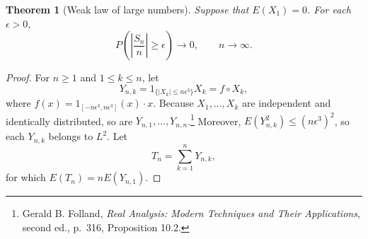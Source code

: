 \documentclass{article}
\newtheorem{theorem}{Theorem}
\theoremstyle{definition}
\begin{document}
\begin{theorem}[Weak law of large numbers]
Suppose that $E(X_1)=0$.
For each $\epsilon>0$,
\[
P\left( \left| \frac{S_n}{n} \right| \geq \epsilon \right) \to 0, \qquad n \to \infty.
\]
\label{weaklaw}
\end{theorem}
\begin{proof}
For $n \geq 1$ and $1 \leq k \leq n$, let
\[
Y_{n,k} = 1_{\{|X_k| \leq n \epsilon^3\}} X_k = f \circ X_k,
\]
where $f(x)=1_{[-n\epsilon^3,n\epsilon^3]}(x) \cdot x$. 
Because $X_1,\ldots,X_k$ are independent and identically distributed, so are 
$Y_{n,1},\ldots,Y_{n,n}$.\footnote{Gerald B. Folland, {\em Real Analysis: Modern Techniques and Their Applications},
second ed., p.~316, Proposition 10.2.}
Moreover, $E(Y_{n,k}^2) \leq (n\epsilon^3)^2$, so each $Y_{n,k}$ belongs to $L^2$. 
Let
\[
T_n = \sum_{k=1}^n Y_{n,k},
\]
for which $E(T_n) = n E(Y_{n,1})$. 



\end{proof}
\end{document}
